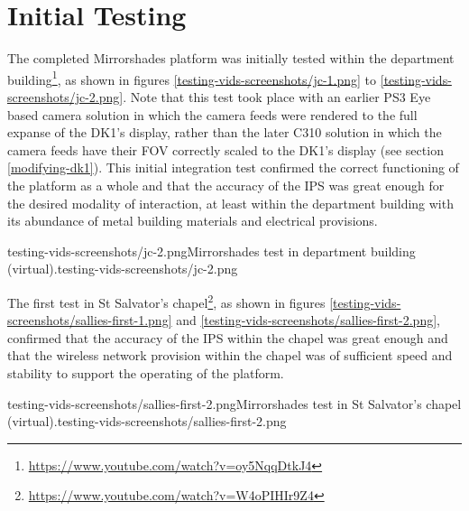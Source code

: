 
\section{Initial Testing}
\label{initial-testing}
The completed Mirrorshades platform was initially tested within the department building\footnote{\url{https://www.youtube.com/watch?v=oy5NqqDtkJ4}}, as shown in figures \ref{testing-vids-screenshots/jc-1.png} to \ref{testing-vids-screenshots/jc-2.png}. Note that this test took place with an earlier PS3 Eye based camera solution in which the camera feeds were rendered to the full expanse of the DK1's display, rather than the later C310 solution in which the camera feeds have their FOV correctly scaled to the DK1's display (see section \ref{modifying-dk1}). This initial integration test confirmed the correct functioning of the platform as a whole and that the accuracy of the IPS was great enough for the desired modality of interaction, at least within the department building with its abundance of metal building materials and electrical provisions.

       {testing-vids-screenshots/jc-2.png}{Mirrorshades test in department building (virtual).}{testing-vids-screenshots/jc-2.png}


The first test in St Salvator's chapel\footnote{\url{https://www.youtube.com/watch?v=W4oPIHIr9Z4}}, as shown in figures \ref{testing-vids-screenshots/sallies-first-1.png} and \ref{testing-vids-screenshots/sallies-first-2.png}, confirmed that the accuracy of the IPS within the chapel was great enough and that the wireless network provision within the chapel was of sufficient speed and stability to support the operating of the platform.

       {testing-vids-screenshots/sallies-first-2.png}{Mirrorshades test in St Salvator's chapel (virtual).}{testing-vids-screenshots/sallies-first-2.png}

